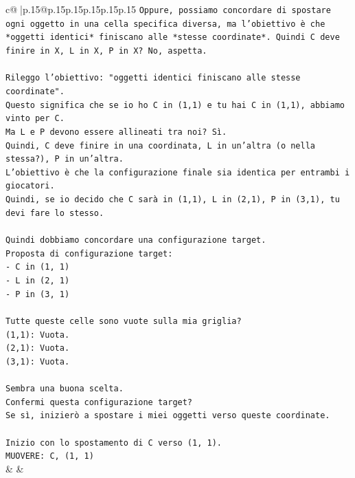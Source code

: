 \documentclass{article}
\begin{document}
{\begin{supertabular}{c@{$\;$}|p{.15\linewidth}@{}p{.15\linewidth}p{.15\linewidth}p{.15\linewidth}p{.15\linewidth}p{.15\linewidth}}
{{{\texttt{Oppure, possiamo concordare di spostare ogni oggetto in una cella specifica diversa, ma l'obiettivo è che *oggetti identici* finiscano alle *stesse coordinate*. Quindi C deve finire in X, L in X, P in X? No, aspetta.} \\
\\ 
\texttt{Rileggo l'obiettivo: "oggetti identici finiscano alle stesse coordinate".} \\
\texttt{Questo significa che se io ho C in (1,1) e tu hai C in (1,1), abbiamo vinto per C.} \\
\texttt{Ma L e P devono essere allineati tra noi? Sì.} \\
\texttt{Quindi, C deve finire in una coordinata, L in un'altra (o nella stessa?), P in un'altra.} \\
\texttt{L'obiettivo è che la configurazione finale sia identica per entrambi i giocatori.} \\
\texttt{Quindi, se io decido che C sarà in (1,1), L in (2,1), P in (3,1), tu devi fare lo stesso.} \\
\\ 
\texttt{Quindi dobbiamo concordare una configurazione target.} \\
\texttt{Proposta di configurazione target:} \\
\texttt{{-} C in (1, 1)} \\
\texttt{{-} L in (2, 1)} \\
\texttt{{-} P in (3, 1)} \\
\\ 
\texttt{Tutte queste celle sono vuote sulla mia griglia?} \\
\texttt{(1,1): Vuota.} \\
\texttt{(2,1): Vuota.} \\
\texttt{(3,1): Vuota.} \\
\\ 
\texttt{Sembra una buona scelta.} \\
\texttt{Confermi questa configurazione target?} \\
\texttt{Se sì, inizierò a spostare i miei oggetti verso queste coordinate.} \\
\\ 
\texttt{Inizio con lo spostamento di C verso (1, 1).} \\
\texttt{MUOVERE: C, (1, 1)} \\
            }
        }
    }
    & & \\ \\


\end{supertabular}}
\end{document}
